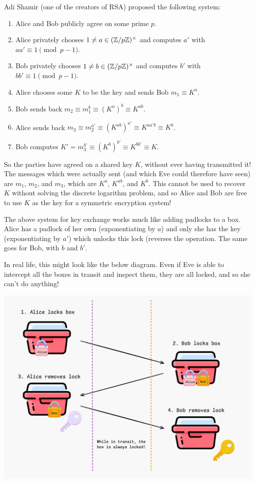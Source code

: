 \documentclass{article}
\begin{document}
Adi Shamir (one of the creators of RSA) proposed the following system:
\begin{enumerate}
    \item Alice and Bob publicly agree on some prime $p$.
    \item Alice privately chooses $1 \neq a \in (\mathbb{Z}/p\mathbb{Z})^\times$ and computes $a'$ with $aa' \equiv 1 \pmod {p-1}$.
    \item Bob privately chooses $1 \neq b \in (\mathbb{Z}/p\mathbb{Z})^\times$ and computes $b'$ with $bb' \equiv 1 \pmod {p-1}$.
    \item Alice chooses some $K$ to be the key and sends Bob $m_1 \equiv K^a$.
    \item Bob sends back $m_2 \equiv m_1^b \equiv (K^a)^b \equiv K^{ab}$.
    \item Alice sends back $m_3 \equiv m_2^{a'} \equiv (K^{ab})^{a'} \equiv K^{aa'b} \equiv K^b$.
    \item Bob computes $K' = m_3^{b'} \equiv (K^b)^{b'} \equiv K^{bb'} \equiv K$.
\end{enumerate}
So the parties have agreed on a shared key $K$, without ever having transmitted it! The messages which were actually sent (and which Eve could therefore have seen) are $m_1$, $m_2$, and $m_3$, which are $K^a$, $K^{ab}$, and $K^b$. This cannot be used to recover $K$ without solving the discrete logarithm problem, and so Alice and Bob are free to use $K$ as the key for a symmetric encryption system!

\begin{remark}
	The above system for key exchange works much like adding padlocks to a box. Alice has a padlock of her own (exponentiating by $a$) and only she has the key (exponentiating by $a'$) which unlocks this lock (reverses the operation. The same goes for Bob, with $b$ and $b'$.
	
	In real life, this might look like the below diagram. Even if Eve is able to intercept all the boxes in transit and inspect them, they are all locked, and so she can't do anything!
	
	\begin{center}
		\includegraphics[width=0.9\linewidth]{figures/key-exchange-padlocks.png}
	\end{center}
\end{remark}
\end{document}

